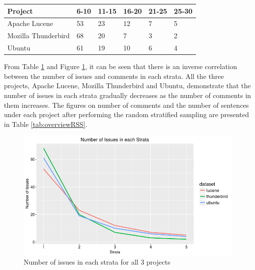 \documentclass[a4paper,12pt,twoside]{report}
\begin{document}
\begin{table} %
    \centering
    \begin{adjustbox}{max width=\columnwidth}
    \def\arraystretch{1} %
    \begin{tabular}{p{4cm} p{2cm} p{2cm} p{2cm} p{2cm} p{2cm}}
        \toprule
        \textbf{Project} & \textbf{6-10} & \textbf{11-15} & \textbf{16-20} & \textbf{21-25} & \textbf{25-30}\\
        \midrule
			Apache Lucene & 53 & 23 & 12 & 7 & 5\\
			Mozilla Thunderbird & 68 & 20 & 7 & 3 & 2\\ 
			Ubuntu & 61 & 19 & 10 & 6 & 4\\
        \midrule
    \end{tabular}
    \end{adjustbox}
    \label{tab:strataProportion}
\end{table}
\noindent \newline
From Table \ref{tab:strataProportion} and Figure \ref{fig:multilineStrata}, it can be seen that there is an inverse correlation between the number of issues and comments in each strata. All the three projects, Apache Lucene, Mozilla Thunderbird and Ubuntu, demonstrate that the number of issues in each strata gradually decreases as the number of comments in them increases. The figures on number of comments and the number of sentences under each project after performing the random stratified sampling are presented in Table \ref{tab:overviewRSS}. 
\newline 
\begin{figure}[h] %
    \centering
    \includegraphics[width=12cm]{rss-multi-line-plot}
    \caption{Number of issues in each strata for all 3 projects}
    \label{fig:multilineStrata}
\end{figure}
\newline 
\end{document}
